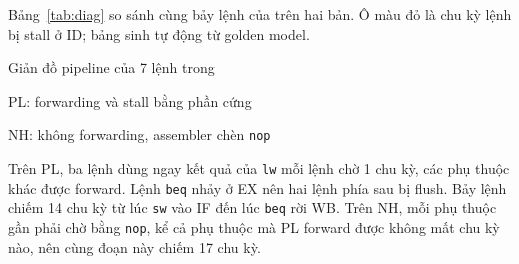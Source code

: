 \documentclass[../report.tex]{subfiles}
\begin{document}
Bảng~\ref{tab:diag} so sánh cùng bảy lệnh của  trên hai bản. Ô màu đỏ là chu kỳ lệnh bị stall
ở ID; bảng sinh tự động từ golden model.

\begin{table}[!htb]
\centering\scriptsize
\caption{Giản đồ pipeline của 7 lệnh trong }\label{tab:diag}
\setlength{\tabcolsep}{1.6pt}
\begin{subtable}{\textwidth}\centering
\caption{PL: forwarding và stall bằng phần cứng}
\begin{adjustbox}{max width=\textwidth}

\end{adjustbox}
\end{subtable}

\vspace{0.8em}
\begin{subtable}{\textwidth}\centering
\caption{NH: không forwarding, assembler chèn \texttt{nop}}
\begin{adjustbox}{max width=\textwidth}

\end{adjustbox}
\end{subtable}
\end{table}

Trên PL, ba lệnh dùng ngay kết quả của \texttt{lw} mỗi lệnh chờ 1 chu kỳ, các phụ thuộc khác được forward. Lệnh
\texttt{beq} nhảy ở EX nên hai lệnh phía sau bị flush. Bảy lệnh chiếm 14 chu kỳ từ lúc \texttt{sw} vào IF đến lúc
\texttt{beq} rời WB. Trên NH, mỗi phụ thuộc gần phải chờ bằng \texttt{nop}, kể cả phụ thuộc mà PL forward được không
mất chu kỳ nào, nên cùng đoạn này chiếm 17 chu kỳ.
\end{document}
